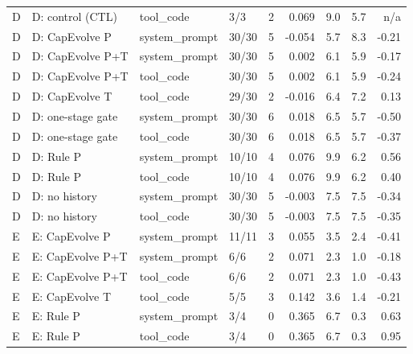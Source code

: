 \begin{table}[t]
{\begin{tabular}{@{}llllrrrrr@{}}
D & D: control (CTL) & tool\_code & 3/3 & 2 & 0.069 & 9.0 & 5.7 & n/a \\
D & D: CapEvolve P & system\_prompt & 30/30 & 5 & -0.054 & 5.7 & 8.3 & -0.21 \\
D & D: CapEvolve P+T & system\_prompt & 30/30 & 5 & 0.002 & 6.1 & 5.9 & -0.17 \\
D & D: CapEvolve P+T & tool\_code & 30/30 & 5 & 0.002 & 6.1 & 5.9 & -0.24 \\
D & D: CapEvolve T & tool\_code & 29/30 & 2 & -0.016 & 6.4 & 7.2 & 0.13 \\
D & D: one-stage gate & system\_prompt & 30/30 & 6 & 0.018 & 6.5 & 5.7 & -0.50 \\
D & D: one-stage gate & tool\_code & 30/30 & 6 & 0.018 & 6.5 & 5.7 & -0.37 \\
D & D: Rule P & system\_prompt & 10/10 & 4 & 0.076 & 9.9 & 6.2 & 0.56 \\
D & D: Rule P & tool\_code & 10/10 & 4 & 0.076 & 9.9 & 6.2 & 0.40 \\
D & D: no history & system\_prompt & 30/30 & 5 & -0.003 & 7.5 & 7.5 & -0.34 \\
D & D: no history & tool\_code & 30/30 & 5 & -0.003 & 7.5 & 7.5 & -0.35 \\
E & E: CapEvolve P & system\_prompt & 11/11 & 3 & 0.055 & 3.5 & 2.4 & -0.41 \\
E & E: CapEvolve P+T & system\_prompt & 6/6 & 2 & 0.071 & 2.3 & 1.0 & -0.18 \\
E & E: CapEvolve P+T & tool\_code & 6/6 & 2 & 0.071 & 2.3 & 1.0 & -0.43 \\
E & E: CapEvolve T & tool\_code & 5/5 & 3 & 0.142 & 3.6 & 1.4 & -0.21 \\
E & E: Rule P & system\_prompt & 3/4 & 0 & 0.365 & 6.7 & 0.3 & 0.63 \\
E & E: Rule P & tool\_code & 3/4 & 0 & 0.365 & 6.7 & 0.3 & 0.95 \\
\bottomrule
\end{tabular}
}
\end{table}
